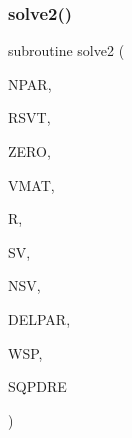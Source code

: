 \subsubsection{\texorpdfstring{solve2()}{solve2()}}
{\footnotesize\ttfamily subroutine solve2 (\begin{DoxyParamCaption}\item[{integer, intent(in)}]{N\+P\+AR,  }\item[{real, intent(in)}]{R\+S\+VT,  }\item[{real, intent(in)}]{Z\+E\+RO,  }\item[{real, dimension(npar,npar), intent(in)}]{V\+M\+AT,  }\item[{real, dimension(npar), intent(in)}]{R,  }\item[{real, dimension(npar), intent(in)}]{SV,  }\item[{integer, intent(out)}]{N\+SV,  }\item[{real, dimension(npar), intent(out)}]{D\+E\+L\+P\+AR,  }\item[{real, dimension(3$\ast$npar), intent(out)}]{W\+SP,  }\item[{real, intent(out)}]{S\+Q\+P\+D\+RE }\end{DoxyParamCaption})}

\mbox{\label{Leroi__c_8f90_a9459812f7e65c931ea1310423669f22a}} 
